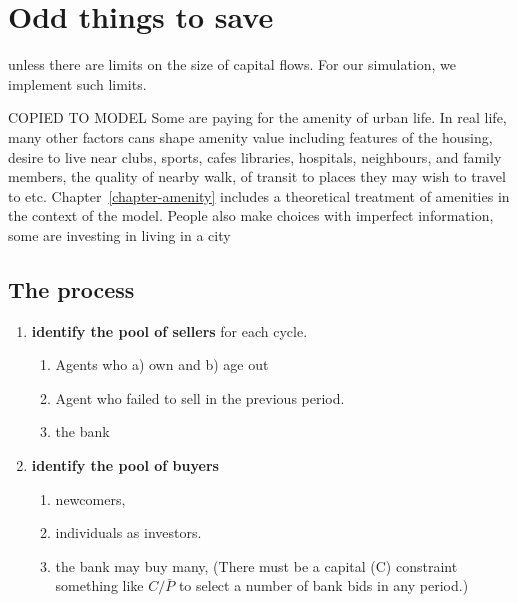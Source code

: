 {\color{blue}
\section{Odd things to save}
unless there are limits on the size of capital flows. For our simulation, we implement such limits. 


 COPIED TO MODEL Some are paying for the amenity of urban life. In real life, many other factors cans shape amenity value including features of the housing, desire to live near clubs, sports, cafes libraries, hospitals, neighbours, and family members, the quality of nearby walk, of transit to places they may wish to travel to etc. Chapter~\ref{chapter-amenity} includes a theoretical treatment of amenities in the context of the model. People also make choices with imperfect information, some are investing in living in a city


\subsection{The process}
\begin{enumerate}
\item \textbf{identify the pool of sellers} for each cycle.
    \begin{enumerate}
        \item Agents who a) own and b) age out
        \item Agent  who failed to sell in the previous period.
        \item the bank
    \end{enumerate}
\item \textbf{identify the pool of buyers} 
    \begin{enumerate}
         \item newcomers, 
         \item individuals as investors.
         \item the bank may buy many, (There must be a capital (C) constraint something like $C/\bar P$ to select a number of bank bids in any period.)
    \end{enumerate}


\end{enumerate}}
